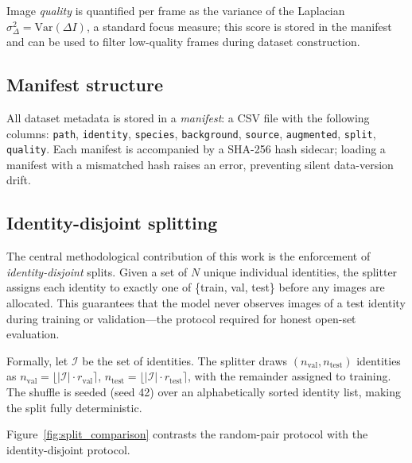 Image \emph{quality} is quantified per frame as the variance of the Laplacian
$\sigma^2_\Delta = \mathrm{Var}(\Delta I)$, a standard focus measure; this score is stored
in the manifest and can be used to filter low-quality frames during dataset construction.

\subsection{Manifest structure}

All dataset metadata is stored in a \emph{manifest}: a CSV file with the following
columns: \texttt{path}, \texttt{identity}, \texttt{species}, \texttt{background},
\texttt{source}, \texttt{augmented}, \texttt{split}, \texttt{quality}.
Each manifest is accompanied by a SHA-256 hash sidecar; loading a manifest with a
mismatched hash raises an error, preventing silent data-version drift.

\subsection{Identity-disjoint splitting}

The central methodological contribution of this work is the enforcement of
\emph{identity-disjoint} splits.  Given a set of $N$ unique individual identities,
the splitter assigns each identity to exactly one of \{train, val, test\} before any
images are allocated.  This guarantees that the model never observes images of a test
identity during training or validation---the protocol required for honest open-set
evaluation.

Formally, let $\mathcal{I}$ be the set of identities.  The splitter draws
$(n_{\mathrm{val}}, n_{\mathrm{test}})$ identities as
$n_{\mathrm{val}} = \lfloor |\mathcal{I}| \cdot r_{\mathrm{val}} \rceil$,
$n_{\mathrm{test}} = \lfloor |\mathcal{I}| \cdot r_{\mathrm{test}} \rceil$,
with the remainder assigned to training.  The shuffle is seeded (seed 42) over an
alphabetically sorted identity list, making the split fully deterministic.

Figure~\ref{fig:split_comparison} contrasts the random-pair protocol with the
identity-disjoint protocol.


